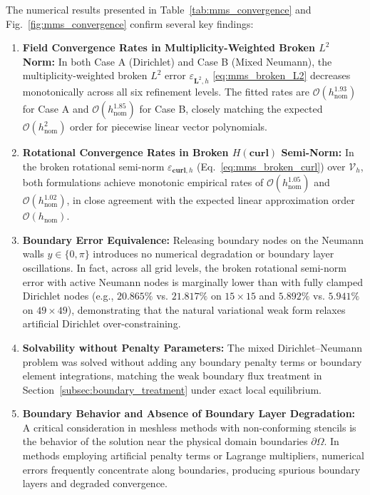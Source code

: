 \documentclass[VANCOUVER,Times1COL]{WileyNJD-v5}
\begin{document}
The numerical results presented in Table~\ref{tab:mms_convergence} and Fig.~\ref{fig:mms_convergence} confirm several key findings:
\begin{enumerate}
    \item \textbf{Field Convergence Rates in Multiplicity-Weighted Broken $L^2$ Norm:} In both Case A (Dirichlet) and Case B (Mixed Neumann), the multiplicity-weighted broken $L^2$ error $\varepsilon_{\boldsymbol{L}^2, h}$ \eqref{eq:mms_broken_L2} decreases monotonically across all six refinement levels. The fitted rates are $\mathcal{O}(h_{\mathrm{nom}}^{1.93})$ for Case A and $\mathcal{O}(h_{\mathrm{nom}}^{1.85})$ for Case B, closely matching the expected $\mathcal{O}(h_{\mathrm{nom}}^2)$ order for piecewise linear vector polynomials.
    \item \textbf{Rotational Convergence Rates in Broken $H(\mathbf{curl})$ Semi-Norm:} In the broken rotational semi-norm $\varepsilon_{\mathbf{curl}, h}$ (Eq.~\eqref{eq:mms_broken_curl}) over $\mathcal{V}_h$, both formulations achieve monotonic empirical rates of $\mathcal{O}(h_{\mathrm{nom}}^{1.05})$ and $\mathcal{O}(h_{\mathrm{nom}}^{1.02})$, in close agreement with the expected linear approximation order $\mathcal{O}(h_{\mathrm{nom}})$.
    \item \textbf{Boundary Error Equivalence:} Releasing boundary nodes on the Neumann walls $y \in \{0, \pi\}$ introduces no numerical degradation or boundary layer oscillations. In fact, across all grid levels, the broken rotational semi-norm error with active Neumann nodes is marginally lower than with fully clamped Dirichlet nodes (e.g., $20.865\%$ vs. $21.817\%$ on $15 \times 15$ and $5.892\%$ vs. $5.941\%$ on $49 \times 49$), demonstrating that the natural variational weak form relaxes artificial Dirichlet over-constraining.
    \item \textbf{Solvability without Penalty Parameters:} The mixed Dirichlet--Neumann problem was solved without adding any boundary penalty terms or boundary element integrations, matching the weak boundary flux treatment in Section~\ref{subsec:boundary_treatment} under exact local equilibrium.
    \item \textbf{Boundary Behavior and Absence of Boundary Layer Degradation:}
          A critical consideration in meshless methods with non-conforming stencils is the behavior of the solution near the physical domain boundaries $\partial\Omega$. In methods employing artificial penalty terms or Lagrange multipliers, numerical errors frequently concentrate along boundaries, producing spurious boundary layers and degraded convergence.

\end{enumerate}
\end{document}
